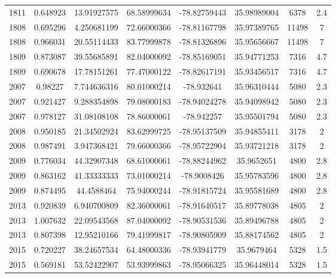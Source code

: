 \documentclass[11pt]{article}
\begin{document}
\begin{longtable*}{|c|c|c|c|c|c|c|c|}
1811  & 0.648923       & 13.91927575       & 68.58999634    & -78.82759443 & 35.98989004 & 6378       & 2.4  \\
1808  & 0.695296       & 4.250681199       & 72.66000366    & -78.81167798 & 35.97389765 & 11498      & 7    \\
1808  & 0.966031       & 20.55114433       & 83.77999878    & -78.81326896 & 35.95656667 & 11498      & 7    \\
1809  & 0.873087       & 39.55685891       & 82.04000092    & -78.85169051 & 35.94771253 & 7316       & 4.7  \\
1809  & 0.690678       & 17.78151261       & 77.47000122    & -78.82617191 & 35.93456517 & 7316       & 4.7  \\
2007  & 0.98227        & 7.744636316       & 80.01000214    & -78.932641   & 35.96310444 & 5080       & 2.3  \\
2007  & 0.921427       & 9.288354898       & 79.08000183    & -78.94024278 & 35.94098942 & 5080       & 2.3  \\
2007  & 0.978127       & 31.08108108       & 78.86000061    & -78.942257   & 35.95501794 & 5080       & 2.3  \\
2008  & 0.950185       & 21.34502924       & 83.62999725    & -78.95137509 & 35.94855411 & 3178       & 2    \\
2008  & 0.987491       & 3.947368421       & 79.66000366    & -78.95722904 & 35.93721218 & 3178       & 2    \\
2009  & 0.776034       & 44.32907348       & 68.61000061    & -78.88244962 & 35.9652651  & 4800       & 2.8  \\
2009  & 0.863162       & 41.33333333       & 73.01000214    & -78.9008426  & 35.95783596 & 4800       & 2.8  \\
2009  & 0.874495       & 44.4588464        & 75.94000244    & -78.91815724 & 35.95581689 & 4800       & 2.8  \\
2013  & 0.920839       & 6.940700809       & 82.36000061    & -78.91640517 & 35.89778038 & 4805       & 2    \\
2013  & 1.007632       & 22.09543568       & 87.04000092    & -78.90531536 & 35.89496788 & 4805       & 2    \\
2013  & 0.807398       & 12.95210166       & 79.41999817    & -78.90805909 & 35.88174562 & 4805       & 2    \\
2015  & 0.720227       & 38.24657534       & 64.48000336    & -78.93941779 & 35.9679464  & 5328       & 1.5  \\
2015  & 0.569181       & 53.52422907       & 53.93999863    & -78.95066325 & 35.96448014 & 5328       & 1.5  \\

\end{longtable*}
\end{document}
